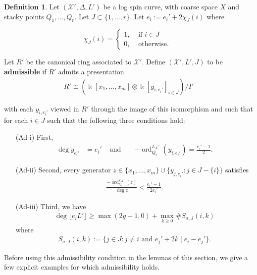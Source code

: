 \documentclass{amsart}
\makeatletter
\theoremstyle{plain}
\theoremstyle{definition}
\newtheorem{defn}[thm]{Definition}
\theoremstyle{remark}
\numberwithin{equation}{section}
\newcommand\Bk{{\Bbbk}}
\DeclareMathOperator{\ord}{ord}
\newcommand\sx{\mathscr X}
\newcommand \subhalf[1]{\frac{{#1} - 1}{2{#1}}}
\newcommand{\halfcan}{L}
\newcommand{\customlabel}[2]{%
   \protected@write \@auxout {}{\string \newlabel {#1}{{#2}{\thepage}{#2}{#1}{}} }%
   \hypertarget{#1}{#2}
}
\makeatother
\begin{document}
\begin{defn}
\label{defn:admissible}
Let $(\sx', \Delta, L')$ be a log spin
curve, with coarse space $X$ and stacky points $Q_1, \ldots, Q_r$.  Let $J \subset
\{1, \ldots, r\}$. Let $e_i := e_i'+ 2 \chi_J (i)$ where

\[
\chi_J(i) = \begin{cases}
	1, &\text{ if }i \in J\\
	0, &\text{ otherwise. } 
\end{cases}
\]

Let $R'$ be the canonical ring associated to $\sx'$. Define $(\sx', \halfcan', J)$
to be {\bf admissible} if $R'$ admits a presentation
\begin{align*}
	R' \cong \left( \Bk[x_1, \ldots, x_m] \otimes \Bk[y_{i, e_i'}]_{i \in J} \right)/I'
\end{align*}

\noindent
with each $y_{i, e_i'}$ viewed in $R'$ through the image of this isomorphism and such that for each $i \in J$ such that the following
three conditions hold:
\begin{enumerate}
	\item[\customlabel{custom:Ad-i}{(Ad-i)}] First, 
		\begin{align*}
		\deg y_{e_i'} &= e_i'  &\text{ and } &&-\ord_{Q_i}^{\halfcan_X'}(y_{i, e_i'})
			= \frac{e_i'- 1}{2}.
		\end{align*}
	\item[\customlabel{custom:Ad-ii}{(Ad-ii)}] Second, every generator $z 
		\in \{x_1, \ldots, x_m\} \cup \{y_{j, e_i'}: j\in J - \{i\} \}$ 
		satisfies
		\begin{align*}
			\frac{-\ord_{Q_i}^{\halfcan_X'}(z)}{\deg z} < \subhalf {e_i'}.
		\end{align*}
	\item[\customlabel{custom:Ad-iii}{(Ad-iii)}] Third, we have
		\begin{align*}
			\deg \lfloor e_i L' \rfloor \geq \max(2g - 1,0) + \max_{k \geq 0} \# S_{\sigma, J}(i, k)
		\end{align*}
		where
		\begin{align*}
			S_{\sigma, J}(i, k) := \{j \in J : j \neq i \text{ and } e_j'+2k
			\mid e_i - e_j'\}.
		\end{align*}
\end{enumerate}
\end{defn}

Before using this admissibility condition in the lemmas of
this section, we give a few explicit examples for which admissibility
holds.
\end{document}
